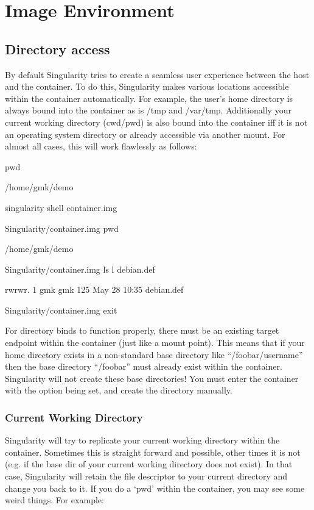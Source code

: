 \documentclass[letterpaper,10pt,english]{sphinxmanual}
\begin{document}
\section{Image Environment}
\label{\detokenize{installation_environments:image-environment}}

\subsection{Directory access}
\label{\detokenize{installation_environments:directory-access}}
By default Singularity tries to create a seamless user experience
between the host and the container. To do this, Singularity makes
various locations accessible within the container automatically. For
example, the user’s home directory is always bound into the container as
is /tmp and /var/tmp. Additionally your current working directory
(cwd/pwd) is also bound into the container iff it is not an operating
system directory or already accessible via another mount. For almost all
cases, this will work flawlessly as follows:

%
\begin{sphinxVerbatim}[commandchars=\\\{\}]
\PYGZdl{} pwd

/home/gmk/demo

\PYGZdl{} singularity shell container.img

Singularity/container.img\PYGZgt{} pwd

/home/gmk/demo

Singularity/container.img\PYGZgt{} ls \PYGZhy{}l debian.def

\PYGZhy{}rw\PYGZhy{}rw\PYGZhy{}r\PYGZhy{}\PYGZhy{}. 1 gmk gmk 125 May 28 10:35 debian.def

Singularity/container.img\PYGZgt{} exit

\PYGZdl{}
\end{sphinxVerbatim}

For directory binds to function properly, there must be an existing
target endpoint within the container (just like a mount point). This
means that if your home directory exists in a non-standard base
directory like “/foobar/username” then the base directory “/foobar”
must already exist within the container.
Singularity will not create these base directories! You must enter the
container with the option  being set, and create the directory
manually.


\subsubsection{Current Working Directory}
\label{\detokenize{installation_environments:current-working-directory}}
Singularity will try to replicate your current working directory within
the container. Sometimes this is straight forward and possible, other
times it is not (e.g. if the base dir of your current working directory
does not exist). In that case, Singularity will retain the file
descriptor to your current directory and change you back to it. If you
do a ‘pwd’ within the container, you may see some weird things. For
example:
\end{document}
